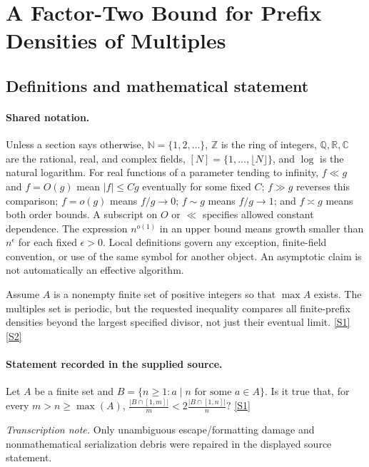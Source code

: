 \documentclass[11pt,a4paper]{article}
\newcommand{\N}{\mathbb{N}}
\newcommand{\Z}{\mathbb{Z}}
\newcommand{\Q}{\mathbb{Q}}
\newcommand{\R}{\mathbb{R}}
\newcommand{\C}{\mathbb{C}}
\newcommand{\sref}[2]{\hyperlink{source:#1:#2}{[S#2]}}
\begin{document}
\section{A Factor-Two Bound for Prefix Densities of Multiples}\label{statement}


\subsection{Definitions and mathematical statement}

\paragraph{Shared notation.}Unless a section says otherwise, $\N=\{1,2,\ldots\}$,
$\Z$ is the ring of integers, $\Q,\R,\C$ are the rational, real, and complex
fields, $[N]=\{1,\ldots,\lfloor N\rfloor\}$, and $\log$ is the natural
logarithm. For real functions of a parameter tending to infinity,
$f\ll g$ and $f=O(g)$ mean $|f|\leq Cg$ eventually for some fixed $C$;
$f\gg g$ reverses this comparison; $f=o(g)$ means $f/g\to0$;
$f\sim g$ means $f/g\to1$; and $f\asymp g$ means both order bounds.
A subscript on $O$ or $\ll$ specifies allowed constant dependence.
The expression $n^{o(1)}$ in an upper bound means growth smaller than
$n^\epsilon$ for each fixed $\epsilon>0$. Local definitions govern any
exception, finite-field convention, or use of the same symbol for another
object. An asymptotic claim is not automatically an effective algorithm.



Assume $A$ is a nonempty finite set of positive integers so that $\max A$ exists. The multiples set is periodic, but the requested inequality compares all finite-prefix densities beyond the largest specified divisor, not just their eventual limit. \sref{statement}{1} \sref{statement}{2}

\paragraph{Statement recorded in the supplied source.}
Let $A$ be a finite set and $ B=\{ n \geq 1 : a\mid n\textrm{ for some }a\in A\}. $ Is it true that, for every $m>n\geq \max(A)$, $ \frac{\lvert B\cap [1,m]\rvert }{m}< 2\frac{\lvert B\cap [1,n]\rvert}{n}? $ \sref{statement}{1}

{\small\emph{Transcription note.} Only unambiguous escape/formatting damage and nonmathematical serialization debris were repaired in the displayed source statement.}
\end{document}
